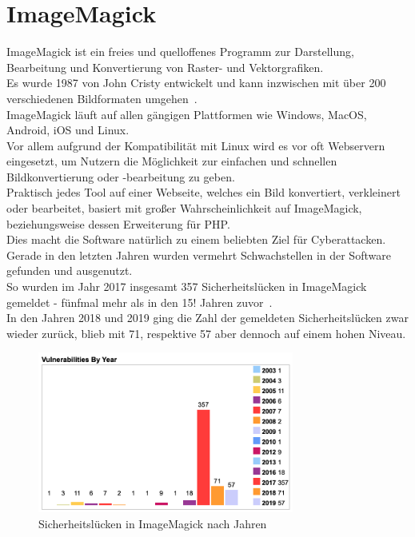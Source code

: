 \section{ImageMagick}\label{sec:imagemagick}

ImageMagick ist ein freies und quelloffenes Programm zur Darstellung, Bearbeitung und Konvertierung von Raster- und Vektorgrafiken.\\
Es wurde 1987 von John Cristy entwickelt und kann inzwischen mit über 200 verschiedenen Bildformaten umgehen~\cite{ImageMagick2020}.\\

ImageMagick läuft auf allen gängigen Plattformen wie Windows, MacOS, Android, iOS und Linux.\\

Vor allem aufgrund der Kompatibilität mit Linux wird es vor oft Webservern eingesetzt, um Nutzern die Möglichkeit zur einfachen und schnellen Bildkonvertierung oder -bearbeitung zu geben.\\
Praktisch jedes Tool auf einer Webseite, welches ein Bild konvertiert, verkleinert oder bearbeitet, basiert mit großer Wahrscheinlichkeit auf ImageMagick, beziehungsweise dessen Erweiterung für PHP.\\

Dies macht die Software natürlich zu einem beliebten Ziel für Cyberattacken.\\
Gerade in den letzten Jahren wurden vermehrt Schwachstellen in der Software gefunden und ausgenutzt.\\

So wurden im Jahr 2017 insgesamt 357 Sicherheitslücken in ImageMagick gemeldet - fünfmal mehr als in den 15!
Jahren zuvor~\cite{ImagemagickProductsVulnerabilities}.\\
In den Jahren 2018 und 2019 ging die Zahl der gemeldeten Sicherheitslücken zwar wieder zurück, blieb mit 71, respektive 57 aber dennoch auf einem hohen Niveau.\\

\begin{figure}[!hb]\centering
    \includegraphics[width=0.75\textwidth]{img/CVEDetailsVulnsYear.png}
    \caption{Sicherheitslücken in ImageMagick nach Jahren}
\end{figure}

